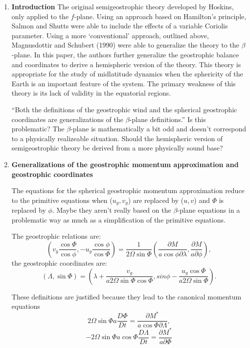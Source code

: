 \documentclass[11pt]{report}
\begin{document}
\begin{enumerate}

\item{\textbf{Introduction}}
The original semigeostrophic theory developed by Hoskins, only applied to the $f$-plane.  Using an
approach based on Hamilton's principle, Salmon and Shutts were able to include the effects of a
variable Coriolis parameter.  Using a more `conventional' approach, outlined above, Magnusdottir
and Schubert (1990) were able to generalize the theory to the $\beta$-plane.  In this paper, the
authors further generalize the geostrophic balance and coordinates to derive a hemispheric version
of the theory.  This theory is appropriate for the study of midlatitude dynamics when the
sphericity of the Earth is an important feature of the system.  The primary weakness of this theory
is its lack of validity in the equatorial regions.

``Both the definitions of the geostrophic wind and the spherical geostrophic coordinates are
generalizations of the $\beta$-plane definitions.''  Is this problematic?  The $\beta$-plane is
mathematically a bit odd and doesn't correspond to a physically realizeable situation.  Should the
hemispheric version of semigeostrophic theory be derived from a more physically sound base?  

\item{\textbf{Generalizations of the geostrophic momentum approximation and geostrophic 
coordinates}}

The equations for the spherical geostrophic momentum approximation reduce to the primitive
equations when ($u_g,v_g$) are replaced by ($u,v$) and $\Phi$ is replaced by $\phi$.  Maybe they
aren't really based on the $\beta$-plane equations in a problematic way as much as a simplification
of the primitive equations.  

The geostrophic relations are: 
\begin{equation}
    \left(v_g\frac{\cos\Phi}{\cos\phi},-u_g\frac{\cos\phi}{\cos\Phi}\right)=
    \frac{1}{2\Omega\sin\Phi}\left(\frac{\partial M}{a\cos\phi\partial\lambda},
    \frac{\partial M}{a\partial\phi}\right), 
\end{equation}    
the geostrophic coordinates are:
\begin{equation}
    (\Lambda,\sin\Phi)=\left(\lambda+\frac{v_g}{a2\Omega\sin\Phi\cos\Phi},
    sin\phi-\frac{u_g\cos\Phi}{a2\Omega\sin\Phi}\right).
\end{equation}

These definitions are justified because they lead to the canonical momentum equations
\begin{equation}
    2\Omega\sin\Phi a\frac{D\Phi}{Dt}=\frac{\partial M^*}{a\cos\Phi\partial\Lambda},
\end{equation}
\begin{equation}
    -2\Omega\sin\Phi a\cos\Phi\frac{D\Lambda}{Dt}=\frac{\partial M^*}{a\partial\Phi}
\end{equation}


\end{enumerate}
\end{document}
